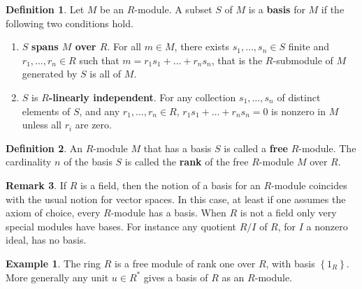 \documentclass{article}
\newcommand{\cb}[1]{\left\{ #1 \right\}}
\theoremstyle{definition}\newtheorem{definition}{Definition}[subsection]
\theoremstyle{definition}\newtheorem{remark}[definition]{Remark}
\theoremstyle{definition}\newtheorem*{example}{Example}
\theoremstyle{definition}\newtheorem*{note}{Note}
\begin{document}
\begin{definition}
Let $ M $ be an $ R $-module. A subset $ S $ of $ M $ is a \textbf{basis} for $ M $ if the following two conditions hold.
\begin{enumerate}
\item $ S $ \textbf{spans $ M $ over $ R $}. For all $ m \in M $, there exists $ s_1, \dots, s_n \in S $ finite and $ r_1, \dots, r_n \in R $ such that $ m = r_1s_1 + \dots + r_ns_n $, that is the $ R $-submodule of $ M $ generated by $ S $ is all of $ M $.
\item $ S $ is \textbf{$ R $-linearly independent}. For any collection $ s_1, \dots, s_n $ of distinct elements of $ S $, and any $ r_1, \dots, r_n \in R $, $ r_1s_1 + \dots + r_ns_n = 0 $ is nonzero in $ M $ unless all $ r_i $ are zero.
\end{enumerate}
\end{definition}

\begin{definition}
An $ R $-module $ M $ that has a basis $ S $ is called a \textbf{free} $ R $-module. The cardinality $ n $ of the basis $ S $ is called the \textbf{rank} of the free $ R $-module $ M $ over $ R $.
\end{definition}


\begin{remark}
If $ R $ is a field, then the notion of a basis for an $ R $-module coincides with the usual notion for vector spaces. In this case, at least if one assumes the axiom of choice, every $ R $-module has a basis. When $ R $ is not a field only very special modules have bases. For instance any quotient $ R / I $ of $ R $, for $ I $ a nonzero ideal, has no basis.
\end{remark}

\begin{example}
The ring $ R $ is a free module of rank one over $ R $, with basis $ \cb{1_R} $. More generally any unit $ u \in R^* $ gives a basis of $ R $ as an $ R $-module.
\end{example}
\end{document}
